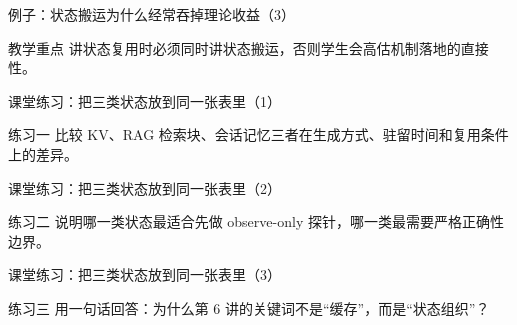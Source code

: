 \begin{frame}{例子：状态搬运为什么经常吞掉理论收益（3）}
\begin{block}{教学重点}
    讲状态复用时必须同时讲状态搬运，否则学生会高估机制落地的直接性。
  \end{block}
\end{frame}

\begin{frame}{课堂练习：把三类状态放到同一张表里（1）}
\begin{block}{练习一}
    比较 KV、RAG 检索块、会话记忆三者在生成方式、驻留时间和复用条件上的差异。
  \end{block}
\end{frame}

\begin{frame}{课堂练习：把三类状态放到同一张表里（2）}
\begin{block}{练习二}
    说明哪一类状态最适合先做 observe-only 探针，哪一类最需要严格正确性边界。
  \end{block}
\end{frame}

\begin{frame}{课堂练习：把三类状态放到同一张表里（3）}
\begin{block}{练习三}
    用一句话回答：为什么第 6 讲的关键词不是“缓存”，而是“状态组织”？
  \end{block}
\end{frame}
